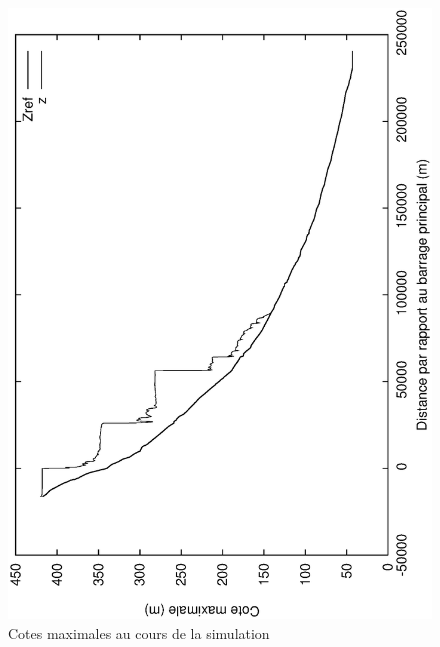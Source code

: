 \documentclass[a4paper,10pt]{article}
\begin{document}
\begin{figure}
 \begin{center}
  \includegraphics[angle=270,width=15cm]{cote_max.eps}
  \caption{Cotes maximales au cours de la simulation}
  \label{fig3}
 \end{center}
\end{figure}
\end{document}
